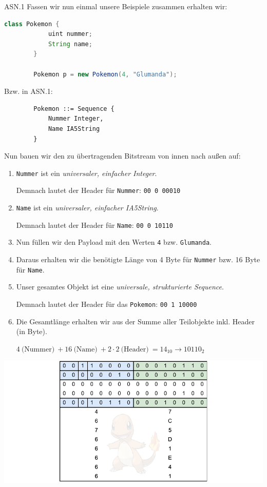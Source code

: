 \begin{example}{ASN.1}
    Fassen wir nun einmal unsere Beispiele zusammen erhalten wir:
    
    \begin{lstlisting}[language=java]
        class Pokemon {
            uint nummer;
            String name;
        }

        Pokemon p = new Pokemon(4, "Glumanda");
    \end{lstlisting}
    
    Bzw. in ASN.1:
    
    \begin{lstlisting}
        Pokemon ::= Sequence {
            Nummer Integer,
            Name IA5String
        }
    \end{lstlisting}
    
    Nun bauen wir den zu übertragenden Bitstream von innen nach außen auf:
    
    \begin{enumerate}
        \item \texttt{Nummer} ist ein \emph{universaler, einfacher Integer}.
              
              Demnach lautet der Header für \texttt{Nummer}: \texttt{00 0 00010}
        \item \texttt{Name} ist ein \emph{universaler, einfacher IA5String}.
              
              Demnach lautet der Header für \texttt{Name}: \texttt{00 0 10110}
        \item Nun füllen wir den Payload mit den Werten \texttt{4} bzw. \texttt{Glumanda}.
        \item Daraus erhalten wir die benötigte Länge von 4 Byte für \texttt{Nummer} bzw. 16 Byte für \texttt{Name}.
        \item Unser gesamtes Objekt ist eine \emph{universale, strukturierte Sequence}.
              
              Demnach lautet der Header für das \texttt{Pokemon}: \texttt{00 1 10000}
        \item Die Gesamtlänge erhalten wir aus der Summe aller Teilobjekte inkl. Header (in Byte).
              
              $4 \ \text{(Nummer)} \ + 16 \ \text{(Name)} \ + 2 \cdot 2 \ \text{(Header)} \ = 14_{10} \to 10110_2$
    \end{enumerate}
    
    \includegraphics[width=\textwidth]{includes/figures/example_asn1.pdf}
\end{example}

